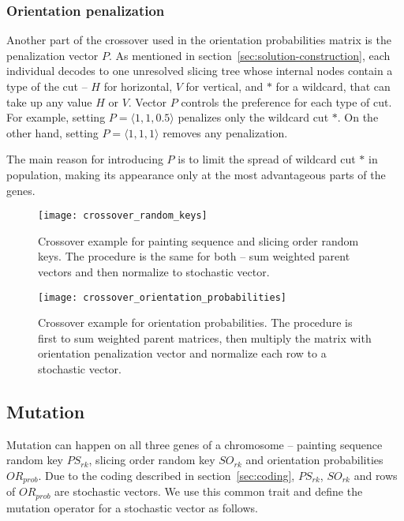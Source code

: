 \subsubsection*{Orientation penalization}

Another part of the crossover used in the orientation probabilities matrix is the penalization vector $P$.
As mentioned in section~\ref{sec:solution-construction}, each individual decodes to one unresolved slicing tree
whose internal nodes contain a type of the cut – $H$ for horizontal, $V$ for vertical, and $*$ for a wildcard, that can take up any value $H$ or $V$.
Vector $P$ controls the preference for each type of cut.
For example, setting $P= \langle 1,1,0.5 \rangle$ penalizes only the wildcard cut $*$.
On the other hand, setting $P= \langle 1,1,1 \rangle$ removes any penalization.

The main reason for introducing $P$ is to limit the spread of wildcard cut $*$ in population,
making its appearance only at the most advantageous parts of the genes.

\begin{figure}[!htp]
    \texttt{[image: crossover\_random\_keys]}
    \caption[Crossover example for painting sequence and slicing order random keys]{
        Crossover example for painting sequence and slicing order random keys.
        The procedure is the same for both – sum weighted parent vectors and then normalize to stochastic vector.
    }
    \label{fig:crossover-random-keys}
\end{figure}

\begin{figure}[!htp]
    \texttt{[image: crossover\_orientation\_probabilities]}
    \caption[Crossover example for orientation probabilities]{
        Crossover example for orientation probabilities. The procedure is first to sum weighted parent matrices,
        then multiply the matrix with orientation penalization vector and normalize each row to a stochastic vector.}
    \label{fig:crossover-orientation-probabilities}
\end{figure}

\newpage
\subsection{Mutation}\label{subsec:mutation}

Mutation can happen on all three genes of a chromosome – painting sequence random key $PS_{rk}$,
slicing order random key $SO_{rk}$ and orientation probabilities $OR_{prob}$.
Due to the coding described in section~\ref{sec:coding}, $PS_{rk}$, $SO_{rk}$ and rows of $OR_{prob}$ are stochastic vectors.
We use this common trait and define the mutation operator for a stochastic vector as follows.

